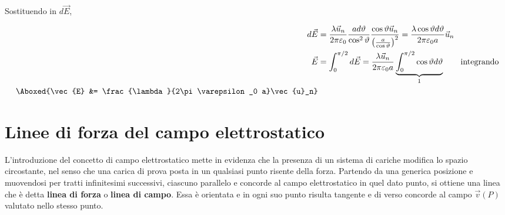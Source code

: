 Sostituendo in $d\vec{E}$,

\begin{align*}
	d\vec{E} &= \frac{\lambda\vec{u}_n}{2\pi \varepsilon_0} \frac{ad\vartheta}{\cos^2 \vartheta} \frac{\cos \vartheta \vec{u}_n}{\left( \frac{a}{\cos \vartheta} \right)^2} = \frac{\lambda\cos \vartheta d\vartheta}{2\pi \varepsilon_0 a}\vec{u}_n \\
	\vec{E} &= \int_0^{\pi /2} d\vec{E} = \frac{\lambda \vec{u}_n}{2\pi \varepsilon_0 a} \underbrace{\int_0^{\pi /2} \cos \vartheta d\vartheta}_1 \tag*{integrando} \\
	\Aboxed{\vec{E} &= \frac{\lambda}{2\pi \varepsilon_0 a}\vec{u}_n}
\end{align*}

\section{Linee di forza del campo elettrostatico}

L'introduzione del concetto di campo elettrostatico mette in evidenza che la presenza di un sistema di cariche modifica lo spazio circostante, nel senso che una carica di prova posta in un qualsiasi punto risente della forza. Partendo da una generica posizione e muovendosi per tratti infinitesimi successivi, ciascuno parallelo e concorde al campo elettrostatico in quel dato punto, si ottiene una linea che è detta \textbf{linea di forza} o \textbf{linea di campo}. Essa è orientata e in ogni suo punto risulta tangente e di verso concorde al campo $\vec{v}(P)$ valutato nello stesso punto.

